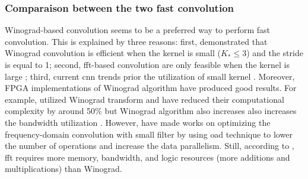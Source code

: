 \subsubsection{Comparaison between the two fast convolution}
Winograd-based convolution seems to be a preferred way to perform fast convolution. This is explained by three reasons: first, \textcite{lavin_fast_2015} demonstrated that Winograd convolution is efficient when the kernel is small ($K_* \leq 3$) and the stride is equal to 1; second, \acrshort{fft}-based convolution are only feasible when the kernel is large \cite{ahmad_towards_2019, chitsaz_acceleration_2020}; third, current \acrshort{cnn} trends prior the utilization of small kernel \cite{liang_evaluating_2020, sandler_mobilenetv2_2019}. \newline \newline
Moreover, FPGA implementations of Winograd algorithm have produced good results. For example, \cite{aydonat_opencl_2017, liang_evaluating_2020} utilized Winograd transform and have reduced their computational complexity by around 50\% but Winograd algorithm also increases also increases the bandwidth utilization \cite{xiao_exploring_2017}. However, \textcite{zeng_optimizing_nodate, chitsaz_acceleration_2020, liang_evaluating_2020} have made works on optimizing the frequency-domain convolution with small filter by using \acrfull{oad} technique \cite{w_smith_scientist_1997} to lower the number of operations and increase the data parallelism. Still, according to \textcite{liang_evaluating_2020, podili_fast_2017}, \acrshort{fft} requires more memory, bandwidth, and logic resources (more additions and multiplications) than Winograd.

